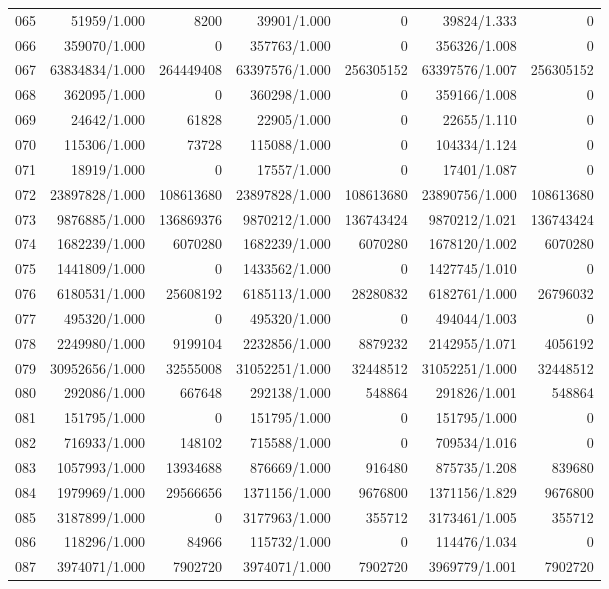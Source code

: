 \begin{longtable}{crrrrrr}
065 & 51959/1.000 & 8200 & 39901/1.000 & 0 & 39824/1.333 & 0 \\
066 & 359070/1.000 & 0 & 357763/1.000 & 0 & 356326/1.008 & 0 \\
067 & 63834834/1.000 & 264449408 & 63397576/1.000 & 256305152 & 63397576/1.007 & 256305152 \\
068 & 362095/1.000 & 0 & 360298/1.000 & 0 & 359166/1.008 & 0 \\
069 & 24642/1.000 & 61828 & 22905/1.000 & 0 & 22655/1.110 & 0 \\
070 & 115306/1.000 & 73728 & 115088/1.000 & 0 & 104334/1.124 & 0 \\
071 & 18919/1.000 & 0 & 17557/1.000 & 0 & 17401/1.087 & 0 \\
072 & 23897828/1.000 & 108613680 & 23897828/1.000 & 108613680 & 23890756/1.000 & 108613680 \\
073 & 9876885/1.000 & 136869376 & 9870212/1.000 & 136743424 & 9870212/1.021 & 136743424 \\
074 & 1682239/1.000 & 6070280 & 1682239/1.000 & 6070280 & 1678120/1.002 & 6070280 \\
075 & 1441809/1.000 & 0 & 1433562/1.000 & 0 & 1427745/1.010 & 0 \\
076 & 6180531/1.000 & 25608192 & 6185113/1.000 & 28280832 & 6182761/1.000 & 26796032 \\
077 & 495320/1.000 & 0 & 495320/1.000 & 0 & 494044/1.003 & 0 \\
078 & 2249980/1.000 & 9199104 & 2232856/1.000 & 8879232 & 2142955/1.071 & 4056192 \\
079 & 30952656/1.000 & 32555008 & 31052251/1.000 & 32448512 & 31052251/1.000 & 32448512 \\
080 & 292086/1.000 & 667648 & 292138/1.000 & 548864 & 291826/1.001 & 548864 \\
081 & 151795/1.000 & 0 & 151795/1.000 & 0 & 151795/1.000 & 0 \\
082 & 716933/1.000 & 148102 & 715588/1.000 & 0 & 709534/1.016 & 0 \\
083 & 1057993/1.000 & 13934688 & 876669/1.000 & 916480 & 875735/1.208 & 839680 \\
084 & 1979969/1.000 & 29566656 & 1371156/1.000 & 9676800 & 1371156/1.829 & 9676800 \\
085 & 3187899/1.000 & 0 & 3177963/1.000 & 355712 & 3173461/1.005 & 355712 \\
086 & 118296/1.000 & 84966 & 115732/1.000 & 0 & 114476/1.034 & 0 \\
087 & 3974071/1.000 & 7902720 & 3974071/1.000 & 7902720 & 3969779/1.001 & 7902720 \\

\end{longtable}
